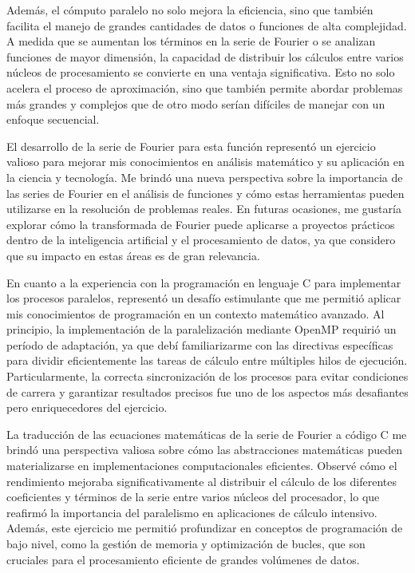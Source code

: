 {Además, el cómputo paralelo no solo mejora la eficiencia, sino que también facilita el manejo de grandes cantidades de datos o funciones de alta complejidad. A medida que se aumentan los términos en la serie de Fourier o se analizan funciones de mayor dimensión, la capacidad de distribuir los cálculos entre varios núcleos de procesamiento se convierte en una ventaja significativa. Esto no solo acelera el proceso de aproximación, sino que también permite abordar problemas más grandes y complejos que de otro modo serían difíciles de manejar con un enfoque secuencial.

El desarrollo de la serie de Fourier para esta función representó un ejercicio valioso para mejorar mis conocimientos en análisis matemático y su aplicación en la ciencia y tecnología. Me brindó una nueva perspectiva sobre la importancia de las series de Fourier en el análisis de funciones y cómo estas herramientas pueden utilizarse en la resolución de problemas reales. En futuras ocasiones, me gustaría explorar cómo la transformada de Fourier puede aplicarse a proyectos prácticos dentro de la inteligencia artificial y el procesamiento de datos, ya que considero que su impacto en estas áreas es de gran relevancia.

En cuanto a la experiencia con la programación en lenguaje C para implementar los procesos paralelos, representó un desafío estimulante que me permitió aplicar mis conocimientos de programación en un contexto matemático avanzado. Al principio, la implementación de la paralelización mediante OpenMP requirió un período de adaptación, ya que debí familiarizarme con las directivas específicas para dividir eficientemente las tareas de cálculo entre múltiples hilos de ejecución. Particularmente, la correcta sincronización de los procesos para evitar condiciones de carrera y garantizar resultados precisos fue uno de los aspectos más desafiantes pero enriquecedores del ejercicio.

La traducción de las ecuaciones matemáticas de la serie de Fourier a código C me brindó una perspectiva valiosa sobre cómo las abstracciones matemáticas pueden materializarse en implementaciones computacionales eficientes. Observé cómo el rendimiento mejoraba significativamente al distribuir el cálculo de los diferentes coeficientes y términos de la serie entre varios núcleos del procesador, lo que reafirmó la importancia del paralelismo en aplicaciones de cálculo intensivo. Además, este ejercicio me permitió profundizar en conceptos de programación de bajo nivel, como la gestión de memoria y optimización de bucles, que son cruciales para el procesamiento eficiente de grandes volúmenes de datos.

}
